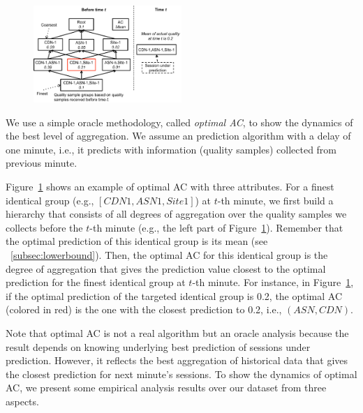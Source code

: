 \begin{figure}[h!]
\centering
 \includegraphics[width=0.5\textwidth] {figures/fig-optimal-AC.pdf}
\label{fig:example-optimal-ac}
\end{figure}

 We use a simple oracle methodology, called {\it optimal AC}, to show the dynamics of the best level of aggregation. We assume an prediction algorithm with a delay of one minute, i.e., it predicts with information (quality samples) collected from previous minute.

Figure~\ref{fig:example-optimal-ac} shows an example of optimal AC with three attributes. For a finest identical group (e.g., $[CDN1,ASN1,Site1]$) at $t$-th minute, we first build a hierarchy that consists of all degrees of aggregation over the quality samples we collects before the $t$-th minute (e.g., the left part of Figure~\ref{fig:example-optimal-ac}). 
Remember that the optimal prediction of this identical group is its mean (see \Section~\ref{subsec:lowerbound}). 
Then, the optimal AC for this identical group is the degree of aggregation that gives the prediction value closest to the optimal prediction for the finest identical group at $t$-th minute. 
For instance, in Figure~\ref{fig:example-optimal-ac}, if the optimal prediction of the targeted identical group is 0.2, the optimal AC (colored in red) is the one with the closest prediction to 0.2, i.e., $(ASN, CDN)$. 

Note that optimal AC is not a real algorithm but an oracle analysis because the result depends on knowing underlying best prediction of sessions under prediction. However, it reflects the best aggregation of historical data that gives the closest prediction for next minute's sessions.
To show the dynamics of optimal AC, we present some empirical analysis results over our dataset from three aspects. 


